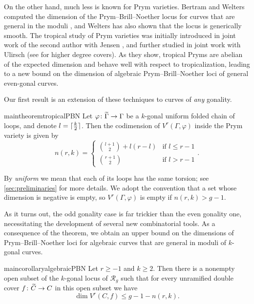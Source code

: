 \documentclass[11pt,reqno]{amsart}
\newcommand*{\cR}{\mathcal{R}}
\newcommand*{\maps}{\nobreak\mskip2mu\mathpunct{}\nonscript
  \mkern-\thinmuskip{:}\mskip6muplus1mu\relax}
\newcommand*{\wti}[1]{\widetilde{#1}}
\DeclarePairedDelimiter{\ceil}{\lceil}{\rceil}
\theoremstyle{definition}
\theoremstyle{problem}
\theoremstyle{plain}
\theoremstyle{remark}
\theoremstyle{theorem}
\numberwithin{equation}{section}
\numberwithin{figure}{section}
\begin{document}
On the other hand, much less is known for Prym varieties. Bertram and
Welters computed the dimension of the Prym--Brill--Noether locus for
curves that are general in the moduli \cite{Bertram_Prym,
  Welters_Prym}, and Welters has also shown that the locus is
generically smooth.  The tropical study of Prym varieties was
initially introduced in joint work of the second author with Jensen
\cite{JL}, and further studied in joint work with Ulirsch
\cite{len2019skeletons} (see \cite{LUZ_Abelian_covers} for higher
degree covers).  As they show, tropical Pryms are abelian of the
expected dimension and behave well with respect to tropicalization,
leading to a new bound on the dimension of algebraic
Prym--Brill--Noether loci of general even-gonal curves.

Our first result is an extension of these techniques to curves of
\emph{any} gonality.

\begin{restatable}{maintheorem}{tropicalPBN}
  \label{thm:tropicalPBN}%
  Let $\varphi\maps\wti\Gamma\to\Gamma$ be a $k$-gonal uniform folded
  chain of loops, and denote $l = \ceil{\frac{k}{2}}$.  Then the
  codimension of $V^r(\Gamma,\varphi)$ inside the Prym variety is
  given by
  \begin{equation}\label{eq:4}
    n(r,k) =
    \begin{cases}
      \binom{l+1}{2}+l(r-l) & \text{if $l \leq r-1$}\\
      \binom{r+1}{2} & \text{if $l>r-1$}
    \end{cases}.
  \end{equation}
\end{restatable}

\noindent By \emph{uniform} we mean that each of its loops has the
same torsion; see \cref{sec:preliminaries} for more details.  We adopt
the convention that a set whose dimension is negative is empty, so
$V^r(\Gamma,\varphi)$ is empty if $n(r,k) > g - 1$.

As it turns out, the odd gonality case is far trickier than the even
gonality one, necessitating the development of several new
combinatorial tools.  As a consequence of the theorem, we obtain an
upper bound on the dimensions of Prym--Brill--Noether loci for
algebraic curves that are general in moduli of $k$-gonal curves.

\begin{restatable}{maincorollary}{algebraicPBN}
  \label{cor:algebraicPBN}%
  Let $r\geq -1$ and $k\geq 2$.  Then there is a nonempty open subset
  of the $k$-gonal locus of $\cR_g$ such that for every unramified
  double cover $f\maps\wti{C}\to C$ in this open subset we have
  \begin{equation}\label{eq:1}
    \dim V^r(C,f) \leq g-1-n(r,k).
  \end{equation}
\end{restatable}
\end{document}
